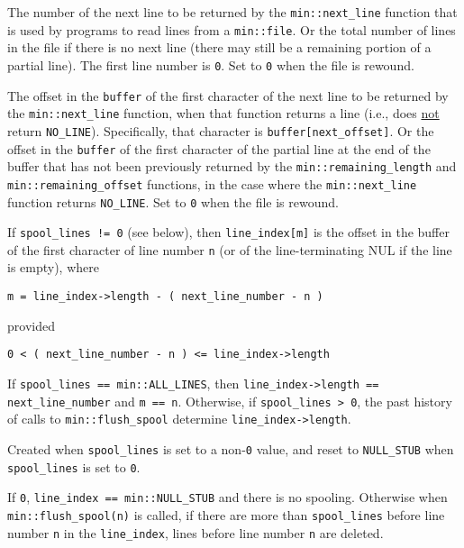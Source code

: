 \documentclass[12pt]{article}
\makeatletter
\newcommand{\ttmkey}[2]{{\tt \bf #1}\index{#1@{\tt #1}!#2}}
\newcommand{\EOL}{\penalty \exhyphenpenalty}
\newenvironment{itemlist}[1][1.2in]%
	{\begin{list}{}{\setlength{\labelwidth}{#1}%
		        \setlength{\leftmargin}{\labelwidth}%
		        \addtolength{\leftmargin}{+0.2in}%
		        \renewcommand{\makelabel}[1]{##1\hfill}}}%
	{\end{list}}
\makeatother
\begin{document}
\begin{itemlist}[1.4in]
\item[\ttmkey{next\_\EOL line\_\EOL number}{in {\tt min::file}}]
The number of the next line to be returned by the
{\tt min::\EOL next\_\EOL line}
function that is used by programs to read lines from a {\tt min::\EOL file}.
Or the total number of lines in the file if there is no next line
(there may still be a remaining portion of a partial line).
The first line number is {\tt 0}.  Set to {\tt 0} when the
file is rewound.

\item[\ttmkey{next\_\EOL offset}{in {\tt min::file}}]
The offset in the {\tt buffer} of the first character of the
next line to be returned by the {\tt min::\EOL next\_\EOL line}
function, when that function returns a line (i.e., does \underline{not}
return {\tt NO\_\EOL LINE}).
Specifically,
that character is {\tt buffer[next\_\EOL offset]}.
Or the offset in the {\tt buffer} of the first character of the
partial line at the end of the buffer
that has not been previously returned by
the {\tt min::\EOL remaining\_\EOL length} and
{\tt min::\EOL remaining\_\EOL offset} functions,
in the case where the {\tt min::\EOL next\_\EOL line}
function returns {\tt NO\_\EOL LINE}.
Set to {\tt 0} when the file is rewound.

\item[\ttmkey{line\_\EOL index}{in {\tt min::file}}]
If {\tt spool\_lines~!=~0} (see below), then
{\tt line\_index[m]} is the offset in the buffer of the first
character of line number {\tt n} (or of the line-terminating NUL
if the line is empty), where
\begin{center}
{\tt m = line\_index->length - ( next\_line\_number - n )}
\end{center}
provided
\begin{center}
{\tt 0 < ( next\_line\_number - n ) <= line\_index->length}
\end{center}
If {\tt spool\_lines~==~min::ALL\_LINES}, then
{\tt line\_\EOL index->\EOL length == next\_\EOL line\_\EOL number}
and {\tt m~==~n}.
Otherwise, if {\tt spool\_lines~>~0}, the past history
of calls to {\tt min::\EOL flush\_\EOL spool} determine
{\tt line\_\EOL index->\EOL length}.

Created when {\tt spool\_\EOL lines} is set to a non-{\tt 0} value,
and reset to {\tt NULL\_STUB} when {\tt spool\_\EOL lines} is set to {\tt 0}.

\item[\ttmkey{spool\_\EOL lines}{in {\tt min::file}}]
If {\tt 0}, {\tt line\_index~==~min::NULL\_STUB} and there is
no spooling.  Otherwise when {\tt min::flush\_spool(n)} is called,
if there are more than {\tt spool\_\EOL lines} before line number
{\tt n} in the {\tt line\_\EOL index}, lines before
line number {\tt n} are deleted.


\end{itemlist}
\end{document}
